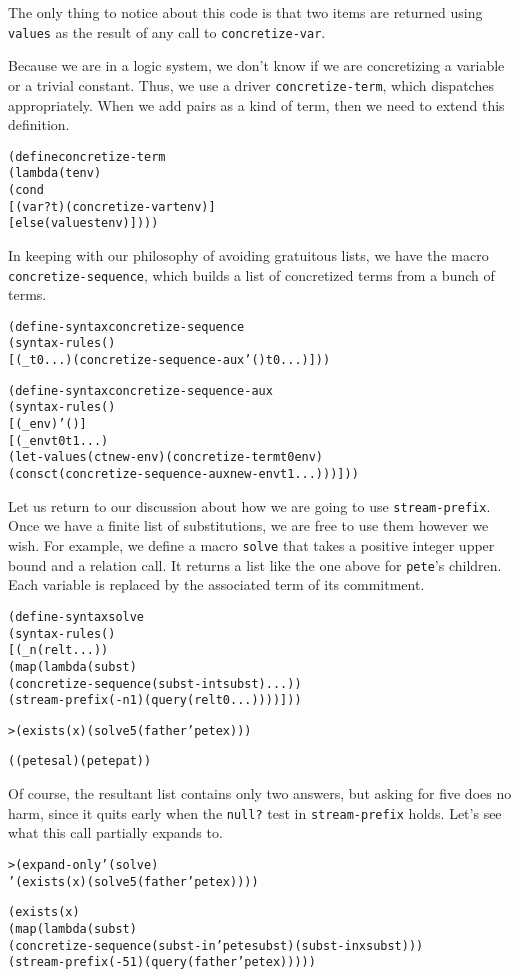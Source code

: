 \noindent
The only thing to notice about this code is that two items are returned
using \texttt{values} as the result of any call to
\texttt{concretize-var}.

Because we are in a logic system, we don't know if we are concretizing
a variable or a trivial constant.  Thus, we use a driver
\texttt{concretize-term}, which dispatches appropriately.  When we add
pairs as a kind of term, then we need to extend this definition.

\begin{alltt}
(define concretize-term
  (lambda (t env)
    (cond
      [(var? t) (concretize-var t env)]
      [else (values t env)])))
\end{alltt}

In keeping with our philosophy of avoiding gratuitous lists, we have
the macro \texttt{concretize-sequence}, which builds a list of
concretized terms from a bunch of terms.  

\begin{alltt}
(define-syntax concretize-sequence
  (syntax-rules ()
    [(_ t0 ...) (concretize-sequence-aux '() t0 ...)]))

(define-syntax concretize-sequence-aux
  (syntax-rules ()
    [(_ env) '()]
    [(_ env t0 t1 ...)
     (let-values (ct new-env) (concretize-term t0 env)
       (cons ct (concretize-sequence-aux new-env t1 ...)))]))
\end{alltt}

Let us return to our discussion about how we are going to use
\texttt{stream-prefix}.  Once we have a finite list of substitutions,
we are free to use them however we wish. For example, we define a
macro \texttt{solve} that takes a positive integer upper bound and a
relation call.  It returns a list like the one above for
\texttt{pete}'s children.  Each variable is replaced by the
associated term of its commitment.

\begin{alltt}
(define-syntax solve
  (syntax-rules ()
    [(_ n (rel t ...))
     (map (lambda (subst)
            (concretize-sequence (subst-in t subst) ...))
       (stream-prefix (- n 1) (query (rel t0 ...))))]))
\end{alltt}

\begin{alltt}
> (exists (x) (solve 5 (father 'pete x)))

((pete sal) (pete pat))
\end{alltt}

\noindent
Of course, the resultant list contains only two answers, but
asking for five does no harm, since it quits early when the
\texttt{null?} test in \texttt{stream-prefix} holds.  
\newpage
Let's see what this call partially expands to.
\begin{alltt}
> (expand-only '(solve)
    '(exists (x) (solve 5 (father 'pete x))))

(exists (x)
  (map (lambda (subst)
         (concretize-sequence (subst-in 'pete subst) (subst-in x subst)))
       (stream-prefix (- 5 1) (query (father 'pete x)))))
\end{alltt}

